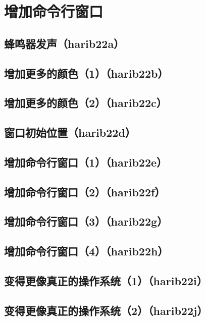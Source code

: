 ﻿\chapter{	增加命令行窗口	}
\section{	蜂鸣器发声（harib22a）	}
\section{	增加更多的颜色（1）（harib22b）	}
\section{	增加更多的颜色（2）（harib22c）	}
\section{	窗口初始位置（harib22d）	}
\section{	增加命令行窗口（1）（harib22e）	}
\section{	增加命令行窗口（2）（harib22f）	}
\section{	增加命令行窗口（3）（harib22g）	}
\section{	增加命令行窗口（4）（harib22h）	}
\section{	变得更像真正的操作系统（1）（harib22i）	}
\section{	变得更像真正的操作系统（2）（harib22j）	}

